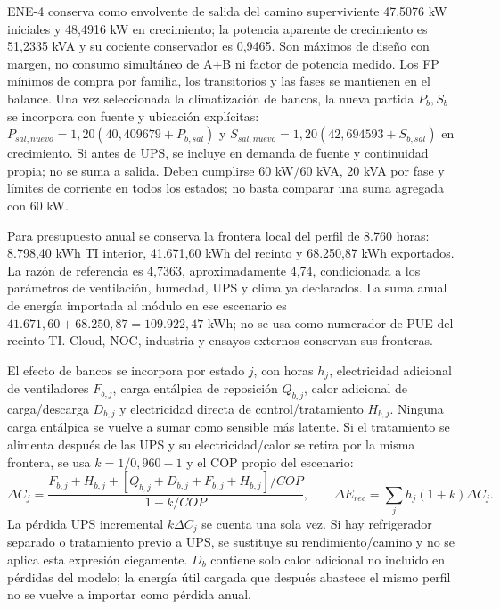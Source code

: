 ENE-4 conserva como envolvente de salida del camino superviviente 47,5076 kW iniciales y 48,4916 kW en crecimiento; la potencia aparente de crecimiento es 51,2335 kVA y su cociente conservador es 0,9465. Son máximos de diseño con margen, no consumo simultáneo de A+B ni factor de potencia medido. Los FP mínimos de compra por familia, los transitorios y las fases se mantienen en el balance. Una vez seleccionada la climatización de bancos, la nueva partida $P_b,S_b$ se incorpora con fuente y ubicación explícitas: $P_{sal,nuevo}=1,20(40,409679+P_{b,sal})$ y $S_{sal,nuevo}=1,20(42,694593+S_{b,sal})$ en crecimiento. Si antes de UPS, se incluye en demanda de fuente y continuidad propia; no se suma a salida. Deben cumplirse 60 kW/60 kVA, 20 kVA por fase y límites de corriente en todos los estados; no basta comparar una suma agregada con 60 kW.

Para presupuesto anual se conserva la frontera local del perfil de 8.760 horas: 8.798,40 kWh TI interior, 41.671,60 kWh del recinto y 68.250,87 kWh exportados. La razón de referencia es 4,7363, aproximadamente 4,74, condicionada a los parámetros de ventilación, humedad, UPS y clima ya declarados. La suma anual de energía importada al módulo en ese escenario es $41.671,60+68.250,87=109.922,47$ kWh; no se usa como numerador de PUE del recinto TI. Cloud, NOC, industria y ensayos externos conservan sus fronteras.

El efecto de bancos se incorpora por estado $j$, con horas $h_j$, electricidad adicional de ventiladores $F_{b,j}$, carga entálpica de reposición $Q_{b,j}$, calor adicional de carga/descarga $D_{b,j}$ y electricidad directa de control/tratamiento $H_{b,j}$. Ninguna carga entálpica se vuelve a sumar como sensible más latente. Si el tratamiento se alimenta después de las UPS y su electricidad/calor se retira por la misma frontera, se usa $k=1/0,960-1$ y el COP propio del escenario:
\[
\Delta C_j=\frac{F_{b,j}+H_{b,j}+[Q_{b,j}+D_{b,j}+F_{b,j}+H_{b,j}]/COP}{1-k/COP},\qquad
\Delta E_{rec}=\sum_j h_j(1+k)\Delta C_j.
\]
La pérdida UPS incremental $k\Delta C_j$ se cuenta una sola vez. Si hay refrigerador separado o tratamiento previo a UPS, se sustituye su rendimiento/camino y no se aplica esta expresión ciegamente. $D_b$ contiene solo calor adicional no incluido en pérdidas del modelo; la energía útil cargada que después abastece el mismo perfil no se vuelve a importar como pérdida anual.

